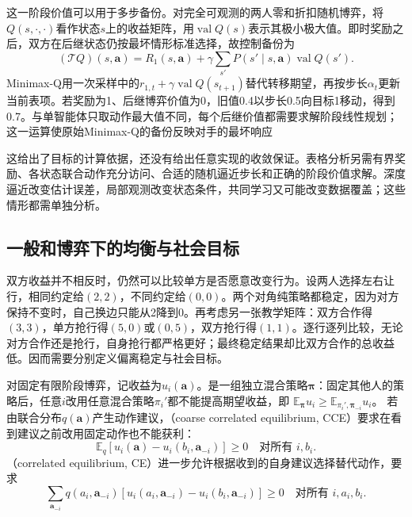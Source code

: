 这一阶段价值可以用于多步备份。对完全可观测的两人零和折扣随机博弈，将$Q(s,\cdot,\cdot)$看作状态$s$上的收益矩阵，用$\operatorname{val}Q(s)$表示其极小极大值。即时奖励之后，双方在后继状态仍按最坏情形标准选择，故控制备份为
\begin{equation}
 (\mathcal T Q)(s,\bm a)
 =R_1(s,\bm a)+\gamma\sum_{s'}P(s'\mid s,\bm a)
           \operatorname{val}Q(s').
 \label{eq:rl-multi-agent-minimax-backup}
\end{equation}
Minimax-Q用一次采样中的$r_{1,t}+\gamma\operatorname{val}Q(s_{t+1})$替代转移期望，再按步长$\alpha_t$更新当前表项。若奖励为1、后继博弈价值为0，旧值0.4以步长0.5向目标1移动，得到0.7。与单智能体只取动作最大值不同，每个后继价值都需要求解阶段线性规划；这一运算使原始Minimax-Q的备份反映对手的最坏响应

这给出了目标的计算依据，还没有给出任意实现的收敛保证。表格分析另需有界奖励、各状态联合动作充分访问、合适的随机逼近步长和正确的阶段价值求解。深度逼近改变估计误差，局部观测改变状态条件，共同学习又可能改变数据覆盖；这些情形都需单独分析。

\subsection{一般和博弈下的均衡与社会目标}
\label{sec:rl-multi-agent-equilibria}

双方收益并不相反时，仍然可以比较单方是否愿意改变行为。设两人选择左右让行，相同约定给$(2,2)$，不同约定给$(0,0)$。两个对角纯策略都稳定，因为对方保持不变时，自己换边只能从2降到0。再考虑另一张教学矩阵：双方合作得$(3,3)$，单方抢行得$(5,0)$或$(0,5)$，双方抢行得$(1,1)$。逐行逐列比较，无论对方合作还是抢行，自身抢行都严格更好；最终稳定结果却比双方合作的总收益低。因而需要分别定义偏离稳定与社会目标。

\begin{definition}[有限阶段博弈的偏离标准]
\label{def:rl-multi-agent-equilibria}
对固定有限阶段博弈，记收益为$u_i(\bm a)$。是一组独立混合策略$\bm\pi$：固定其他人的策略后，任意$i$改用任意混合策略$\pi_i'$都不能提高期望收益，即
$\mathbb E_{\bm\pi}u_i\geq\mathbb E_{\pi_i',\bm\pi_{-i}}u_i$。
若由联合分布$q(\bm a)$产生动作建议，（coarse correlated equilibrium, CCE）要求在看到建议之前改用固定动作也不能获利：
\[
 \mathbb E_q[u_i(\bm a)-u_i(b_i,\bm a_{-i})]\geq0
 \quad\text{对所有 }i,b_i.
\]
（correlated equilibrium, CE）进一步允许根据收到的自身建议选择替代动作，要求
\[
 \sum_{\bm a_{-i}}q(a_i,\bm a_{-i})
 [u_i(a_i,\bm a_{-i})-u_i(b_i,\bm a_{-i})]\geq0
 \quad\text{对所有 }i,a_i,b_i.
\]
\end{definition}


